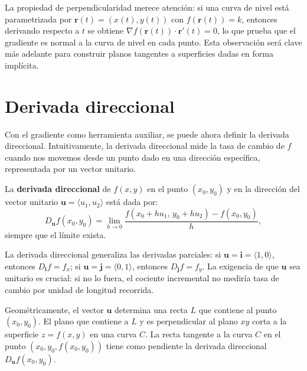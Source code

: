 \begin{rem}
La propiedad de perpendicularidad merece atención: si una curva de nivel
está parametrizada por $\mathbf{r}(t) = (x(t), y(t))$ con
$f(\mathbf{r}(t)) = k$, entonces derivando respecto a $t$ se obtiene
$\nabla f(\mathbf{r}(t))\cdot \mathbf{r}'(t) = 0$, lo que prueba que el
gradiente es normal a la curva de nivel en cada punto. Esta observación
será clave más adelante para construir planos tangentes a superficies
dadas en forma implícita.
\end{rem}

\section{Derivada direccional}

Con el gradiente como herramienta auxiliar, se puede ahora definir la derivada direccional. Intuitivamente, la derivada direccional mide la tasa de cambio de $f$ cuando nos movemos desde un punto dado en una dirección específica, representada por un vector unitario.

\begin{definition}
La \textbf{derivada direccional} de $f(x,y)$ en el punto
$(x_0,y_0)$ y en la dirección del vector unitario
$\mathbf{u} = \langle u_1, u_2 \rangle$ está dada por:
\[
D_{\mathbf{u}} f(x_0,y_0)
= \lim_{h \to 0} \frac{f(x_0 + h u_1,\, y_0 + h u_2) - f(x_0,y_0)}{h},
\]
siempre que el límite exista.
\end{definition}

\begin{rem}
La derivada direccional generaliza las derivadas parciales: si
$\mathbf{u} = \mathbf{i} = \langle 1,0 \rangle$, entonces
$D_{\mathbf{i}} f = f_x$; si $\mathbf{u} = \mathbf{j} = \langle 0,1
\rangle$, entonces $D_{\mathbf{j}} f = f_y$. La exigencia de que
$\mathbf{u}$ sea unitario es crucial: si no lo fuera, el cociente
incremental no mediría tasa de cambio por unidad de longitud recorrida.
\end{rem}

Geométricamente, el vector $\mathbf{u}$ determina una recta $L$ que
contiene al punto $(x_0,y_0)$. El plano que contiene a $L$ y es
perpendicular al plano $xy$ corta a la superficie $z=f(x,y)$ en una
curva $C$. La recta tangente a la curva $C$ en el punto
$(x_0,y_0,f(x_0,y_0))$ tiene como pendiente la derivada direccional
$D_{\mathbf{u}} f(x_0,y_0)$.

